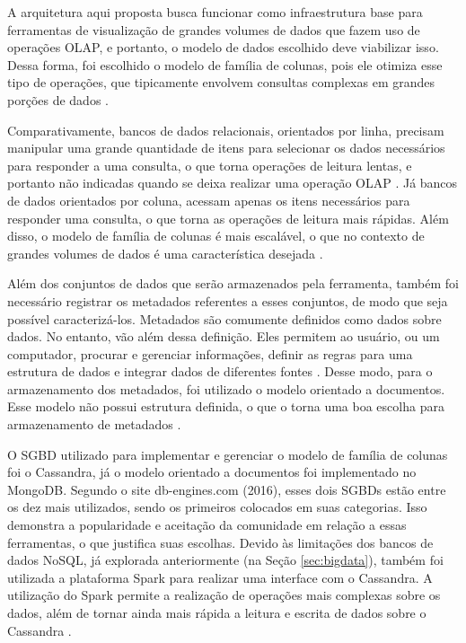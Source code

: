 A arquitetura aqui proposta busca funcionar como infraestrutura base para ferramentas de
visualização de grandes volumes de dados que fazem uso de operações OLAP, e portanto, 
o modelo de dados escolhido deve viabilizar isso. Dessa forma, foi escolhido o modelo de 
família de colunas, pois ele otimiza esse tipo de operações, que tipicamente envolvem
consultas complexas em grandes porções de dados \cite{sorjonen2012olap}. 

Comparativamente, bancos de dados relacionais, orientados por linha, precisam manipular uma 
grande quantidade de itens para selecionar os dados necessários para responder a uma consulta, 
o que torna operações de leitura lentas, e portanto não indicadas quando se deixa realizar 
uma operação OLAP \cite{sorjonen2012olap}. Já bancos de dados orientados por coluna, acessam 
apenas os itens necessários para responder uma consulta, o que torna as operações de leitura
mais rápidas. Além disso, o modelo de família de colunas é mais escalável, o que no contexto
de grandes volumes de dados é uma característica desejada \cite{moniruzzaman2013nosql}.

Além dos conjuntos de dados que serão armazenados pela ferramenta, também foi necessário 
registrar os metadados referentes a esses conjuntos, de modo que seja possível 
caracterizá-los. Metadados são comumente definidos como dados sobre dados. No entanto, vão 
além dessa definição. Eles permitem ao usuário, ou um computador, procurar e gerenciar 
informações, definir as regras para uma estrutura de dados e integrar dados de diferentes 
fontes \cite{turner2002metadata}. Desse modo, para o armazenamento dos metadados, foi 
utilizado o modelo orientado a documentos. Esse modelo não possui 
estrutura definida, o que o torna uma boa escolha para armazenamento de metadados 
\cite{de2010nosql}.

O SGBD utilizado para implementar e gerenciar o modelo de família de colunas foi o 
Cassandra, já o modelo orientado a documentos foi implementado no MongoDB. 
Segundo o site db-engines.com (2016), esses dois SGBDs estão entre os dez mais utilizados, 
sendo os primeiros colocados em suas categorias. Isso demonstra a popularidade e aceitação 
da comunidade em relação a essas ferramentas, o que justifica suas escolhas. Devido às 
limitações dos bancos de dados NoSQL, já explorada anteriormente (na Seção \ref{sec:bigdata}), 
também foi utilizada a plataforma Spark para realizar uma interface com o Cassandra. A 
utilização do Spark permite a realização de operações mais complexas sobre os dados, além de 
tornar ainda mais rápida a leitura e escrita de dados sobre o Cassandra \cite{kolaczkowski2014}.

